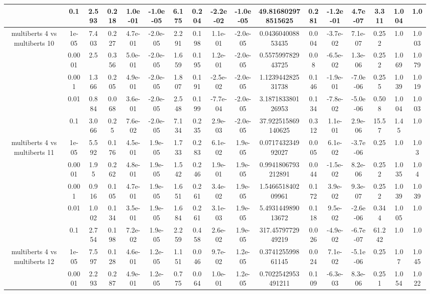 \begin{tabular}{|c|c|c|c|c|c|c|c|c|c|c|c|c|c|c|c|c|}
 & 0.1 & 2.593 & 0.218 & 1.0e-01 & -1.0e-05 & 6.175 & 0.204 & -2.2e-02 & -1.0e-05 & 49.816802978515625 & 0.281 & -1.2e-01 & 4.7e-07 & 3.311 & 1.004 & 1.0 \\
\hline
\multirow{5}{*}{multiberts 4 vs multiberts 10} & 1e-05 & 7.403 & 0.227 & 4.7e-01 & -2.0e-05 & 2.291 & 0.198 & 1.1e-01 & -2.0e-05 & 0.043604008853435 & 0.004 & -3.7e-02 & 7.1e-07 & 0.252 & 1.0 & 1.003 \\
 & 0.0001 & 2.5 & 0.356 & 5.0e-01 & -2.0e-05 & 1.659 & 0.195 & 1.2e-01 & -2.0e-05 & 0.557599782943725 & 0.08 & -6.5e-02 & 1.3e-06 & 0.252 & 1.069 & 1.079 \\
 & 0.001 & 1.366 & 0.205 & 4.9e-01 & -2.0e-05 & 1.807 & 0.191 & -2.5e-02 & -2.0e-05 & 1.123944282531738 & 0.146 & -1.9e-01 & -7.0e-06 & 0.255 & 1.039 & 1.019 \\
 & 0.01 & 0.884 & 0.068 & 3.6e-01 & -2.0e-05 & 2.548 & 0.199 & -7.7e-04 & -2.0e-05 & 3.187183380126953 & 0.134 & -7.8e-02 & -5.0e-06 & 0.508 & 1.004 & 1.003 \\
 & 0.1 & 3.066 & 0.25 & 7.6e-02 & -2.0e-05 & 7.134 & 0.235 & 2.9e-03 & -2.0e-05 & 37.922515869140625 & 0.312 & 1.1e-01 & 2.9e-06 & 15.57 & 1.45 & 1.0 \\
\hline
\multirow{5}{*}{multiberts 4 vs multiberts 11} & 1e-05 & 5.592 & 0.176 & 4.5e-01 & 1.9e-05 & 1.733 & 0.283 & 6.1e-02 & 1.9e-05 & 0.071743234992027 & 0.005 & 6.1e-02 & -3.7e-06 & 0.25 & 1.0 & 1.03 \\
 & 0.0001 & 1.95 & 0.262 & 4.8e-01 & 1.9e-05 & 1.542 & 0.246 & 1.9e-01 & 1.9e-05 & 0.9941806793212891 & 0.044 & -1.5e-02 & 8.2e-06 & 0.252 & 1.035 & 1.04 \\
 & 0.001 & 0.916 & 0.105 & 4.7e-01 & 1.9e-05 & 1.651 & 0.261 & 3.4e-02 & 1.9e-05 & 1.546651840209961 & 0.172 & 3.9e-02 & 9.3e-07 & 0.252 & 1.039 & 1.039 \\
 & 0.01 & 1.002 & 0.134 & 3.5e-01 & 1.9e-05 & 1.684 & 0.261 & 3.1e-03 & 1.9e-05 & 5.493144989013672 & 0.118 & 9.5e-02 & -2.6e-06 & 0.344 & 1.005 & 1.0 \\
 & 0.1 & 2.754 & 0.198 & 7.2e-02 & 1.9e-05 & 2.259 & 0.458 & 2.6e-02 & 1.9e-05 & 317.4579772949219 & 0.026 & -4.9e-02 & -6.7e-07 & 61.242 & 1.0 & 1.0 \\
\hline
\multirow{5}{*}{multiberts 4 vs multiberts 12} & 1e-05 & 7.597 & 0.128 & 4.6e-01 & 1.2e-05 & 1.151 & 0.046 & 9.7e-02 & 1.2e-05 & 0.374125599861145 & 0.024 & 7.1e-02 & -5.1e-06 & 0.25 & 1.07 & 1.045 \\
 & 0.0001 & 2.293 & 0.287 & 4.9e-01 & 1.2e-05 & 0.775 & 0.064 & 1.0e-01 & 1.2e-05 & 0.7022542953491211 & 0.109 & -6.3e-03 & 8.3e-06 & 0.251 & 1.054 & 1.022 \\

\end{tabular}
